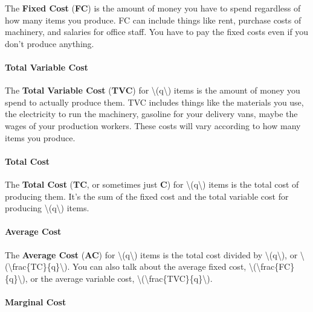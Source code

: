 The \textbf{Fixed Cost} (\textbf{FC}) is the amount of money you have to
spend regardless of how many items you produce. FC can include things
like rent, purchase costs of machinery, and salaries for office staff.
You have to pay the fixed costs even if you don't produce anything.

\hypertarget{total-variable-cost}{%
\paragraph{Total Variable Cost}\label{total-variable-cost}}

The \textbf{Total Variable Cost} (\textbf{TVC}) for
\textbackslash{}(q\textbackslash{}) items is the amount of money you
spend to actually produce them. TVC includes things like the materials
you use, the electricity to run the machinery, gasoline for your
delivery vans, maybe the wages of your production workers. These costs
will vary according to how many items you produce.

\hypertarget{total-cost}{%
\paragraph{Total Cost}\label{total-cost}}

The \textbf{Total Cost} (\textbf{TC}, or sometimes just \textbf{C}) for
\textbackslash{}(q\textbackslash{}) items is the total cost of producing
them. It's the sum of the fixed cost and the total variable cost for
producing \textbackslash{}(q\textbackslash{}) items.

\hypertarget{average-cost}{%
\paragraph{Average Cost}\label{average-cost}}

The \textbf{Average Cost} (\textbf{AC}) for
\textbackslash{}(q\textbackslash{}) items is the total cost divided by
\textbackslash{}(q\textbackslash{}), or
\textbackslash{}(\textbackslash{}frac\{TC\}\{q\}\textbackslash{}). You
can also talk about the average fixed cost,
\textbackslash{}(\textbackslash{}frac\{FC\}\{q\}\textbackslash{}), or
the average variable cost,
\textbackslash{}(\textbackslash{}frac\{TVC\}\{q\}\textbackslash{}).

\hypertarget{marginal-cost}{%
\paragraph{Marginal Cost}\label{marginal-cost}}

